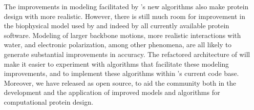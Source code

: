 The improvements in modeling facilitated by 's new algorithms also make protein design with \osprey more realistic.  However, there is still much room for improvement in the biophysical model used by \osprey and indeed by all currently available protein software.  Modeling of larger backbone motions, more realistic interactions with water, and electronic polarization, among other phenomena, are all likely to generate substantial improvements in accuracy.  The refactored architecture of  will make it easier to experiment with algorithms that facilitate these modeling improvements, and to implement these algorithms within \osprey's current code base.  Moreover, we have released  as open source, to aid the community both in the development and the application of improved models and algorithms for computational protein design.  


